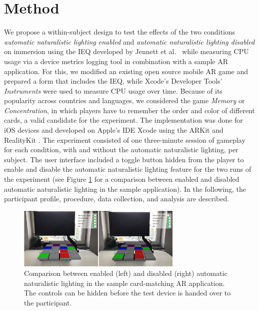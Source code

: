\documentclass[12pt,twoside,english]{article}
\begin{document}
\section{Method}
\label{sect:method}

We propose a within-subject design to test the effects of the two conditions \textit{automatic naturalistic lighting enabled} and \textit{automatic naturalistic lighting disabled} on immersion using the \gls{IEQ} developed by Jennett et al.~\cite{jennett_measuring_2008} while measuring \gls{CPU} usage via a device metrics logging tool in combination with a sample \gls{AR} application.
For this, we modified an existing open source mobile \gls{AR} game and prepared a form that includes the \gls{IEQ}, while Xcode's Developer Tools' \textit{Instruments} were used to measure \gls{CPU} usage over time.
Because of its popularity across countries and languages, we considered the game \textit{Memory} or \textit{Concentration}, in which players have to remember the order and color of different cards, a valid candidate for the experiment.
The implementation was done for iOS devices and developed on Apple's \gls{IDE} Xcode using the ARKit and RealityKit .
The experiment consisted of one three-minute session of gameplay for each condition, with and without the automatic naturalistic lighting, per subject.
The user interface included a toggle button hidden from the player to enable and disable the automatic naturalistic lighting feature for the two runs of the experiment (see Figure \ref{fig:sample_app_comparison} for a comparison between enabled and disabled automatic naturalistic lighting in the sample application).
In the following, the participant profile, procedure, data collection, and analysis are described.

\begin{figure}[h]
    \centering
    \includegraphics[width=0.7\textwidth]{imgs/sample_app_comparison.png}
    \caption{Comparison between enabled (left) and disabled (right) automatic naturalistic lighting in the sample card-matching \gls{AR} application. The controls can be hidden before the test device is handed over to the participant.}
    \label{fig:sample_app_comparison}
\end{figure}
\end{document}
